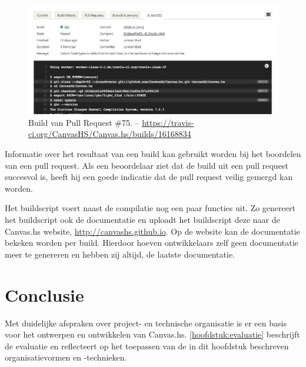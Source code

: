 \begin{figure}[H]
\begin{center}
\includegraphics[keepaspectratio,width=\textwidth]{./images/travis.png}
\caption{Build van Pull Request \#75. – \url{https://travis-ci.org/CanvasHS/Canvas.hs/builds/16168834}}
\label{fig:travis}
\end{center}
\end{figure}

Informatie over het resultaat van een build kan gebruikt worden bij het boordelen van een pull request. Als een beoordelaar ziet dat de build uit een pull request succesvol is, heeft hij een goede indicatie dat de pull request veilig gemergd kan worden.

Het buildscript voert naast de compilatie nog een paar functies uit. Zo genereert het buildscript ook de documentatie en uploadt het buildscript deze naar de Canvas.hs website, \url{http://canvashs.github.io}. Op de website kan de documentatie bekeken worden per build. Hierdoor hoeven ontwikkelaars zelf geen documentatie meer te genereren en hebben zij altijd, de laatste documentatie.

\section{Conclusie}
Met duidelijke afspraken over project- en technische organisatie is er een basis voor het ontwerpen en ontwikkelen van Canvas.hs. \autoref{hoofdstuk:evaluatie} beschrijft de evaluatie en reflecteert op het toepassen van de in dit hoofdstuk beschreven organisatievormen en -technieken. 
